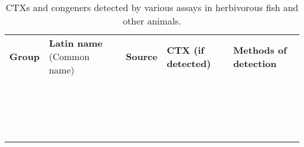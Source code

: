 \documentclass[12pt]{article}
\begin{document}
\begin{table}
\caption{CTXs and congeners detected by various assays in herbivorous fish and other animals.}
\label{tbl:HerbTable}
\begin{tabular}{ p{2cm} p{3cm}  p{4.5cm}  p{2cm}  p{3cm}  }
\textbf{Group} & \textbf{Latin name} (Common name) & \textbf{Source} & \textbf{CTX (if detected)} & \textbf{Methods of detection} \\
  &  \emph{} &  &  & \\
  & \emph{}  &  &  & \\
  & \emph{} &  &  & \\
  &  \emph{} &  &  & \\
  & \emph{}  &  &  & \\
  & \emph{} &  &  & \\
  &  \emph{} &  &  & \\
  & \emph{}  &  &  & \\
  & \emph{} &  &  & \\
  &  \emph{} &  &  & \\
  & \emph{}  &  &  & \\
  & \emph{} &  &  & \\
  &  \emph{} &  &  & \\
  & \emph{}  &  &  & \\
  & \emph{} &  &  & \\
  &  \emph{} &  &  & \\
  & \emph{}  &  &  & \\
  & \emph{} &  &  & \\
\end{tabular}
\end{table}
\FloatBarrier
\end{document}
